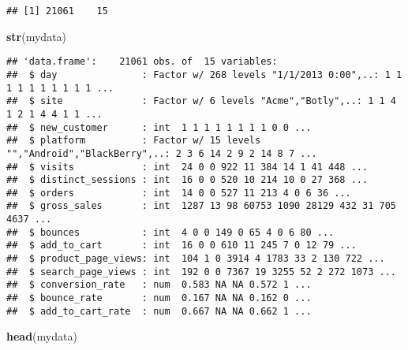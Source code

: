 \documentclass[]{article}
\newenvironment{Shaded}{\begin{snugshade}}{\end{snugshade}}
\newcommand{\KeywordTok}[1]{\textcolor[rgb]{0.13,0.29,0.53}{\textbf{{#1}}}}
\newcommand{\NormalTok}[1]{{#1}}
\begin{document}
\begin{verbatim}
## [1] 21061    15
\end{verbatim}

\begin{Shaded}
\begin{Highlighting}[]
\KeywordTok{str}\NormalTok{(mydata)}
\end{Highlighting}
\end{Shaded}

\begin{verbatim}
## 'data.frame':    21061 obs. of  15 variables:
##  $ day               : Factor w/ 268 levels "1/1/2013 0:00",..: 1 1 1 1 1 1 1 1 1 1 ...
##  $ site              : Factor w/ 6 levels "Acme","Botly",..: 1 1 4 1 2 1 4 4 1 1 ...
##  $ new_customer      : int  1 1 1 1 1 1 1 1 0 0 ...
##  $ platform          : Factor w/ 15 levels "","Android","BlackBerry",..: 2 3 6 14 2 9 2 14 8 7 ...
##  $ visits            : int  24 0 0 922 11 384 14 1 41 448 ...
##  $ distinct_sessions : int  16 0 0 520 10 214 10 0 27 368 ...
##  $ orders            : int  14 0 0 527 11 213 4 0 6 36 ...
##  $ gross_sales       : int  1287 13 98 60753 1090 28129 432 31 705 4637 ...
##  $ bounces           : int  4 0 0 149 0 65 4 0 6 80 ...
##  $ add_to_cart       : int  16 0 0 610 11 245 7 0 12 79 ...
##  $ product_page_views: int  104 1 0 3914 4 1783 33 2 130 722 ...
##  $ search_page_views : int  192 0 0 7367 19 3255 52 2 272 1073 ...
##  $ conversion_rate   : num  0.583 NA NA 0.572 1 ...
##  $ bounce_rate       : num  0.167 NA NA 0.162 0 ...
##  $ add_to_cart_rate  : num  0.667 NA NA 0.662 1 ...
\end{verbatim}

\begin{Shaded}
\begin{Highlighting}[]
\KeywordTok{head}\NormalTok{(mydata)}
\end{Highlighting}
\end{Shaded}
\end{document}
